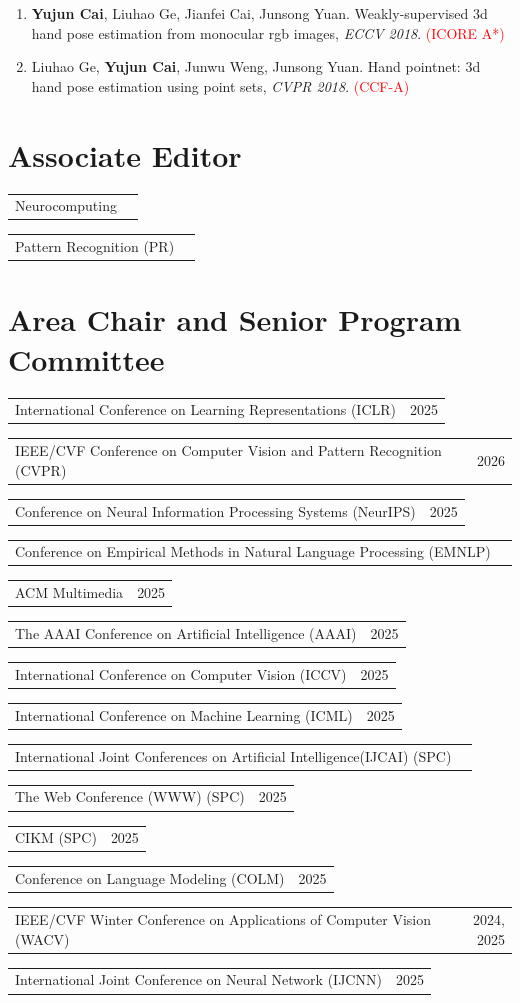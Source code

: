\documentclass[11pt,letterpaper]{article}
\makeatletter
\newcommand{\cvService}[2]{\par\begin{tabularx}{\linewidth}{@{}Xr@{}}#1 & #2\end{tabularx}\par}
\makeatother
\begin{document}
\begin{enumerate}
\item \textbf{Yujun Cai}, Liuhao Ge, Jianfei Cai, Junsong Yuan. Weakly-supervised 3d hand pose estimation from monocular rgb images, \textit{ECCV 2018}. \textcolor{red}{(ICORE A*)}

\item Liuhao Ge, \textbf{Yujun Cai}, Junwu Weng, Junsong Yuan. Hand pointnet: 3d hand pose estimation using point sets, \textit{CVPR 2018}. \textcolor{red}{(CCF-A)}
\end{enumerate}

\section*{Associate Editor}
\cvService{Neurocomputing}{}
\cvService{Pattern Recognition (PR)}{}
\section*{Area Chair and Senior Program Committee}
\cvService{International Conference on Learning Representations (ICLR)}{2025}
\cvService{IEEE/CVF Conference on Computer Vision and Pattern Recognition (CVPR)}{2026}
\cvService{Conference on Neural Information Processing Systems (NeurIPS)}{2025}
\cvService{Conference on Empirical Methods in Natural Language Processing (EMNLP)}{}
\cvService{ACM Multimedia}{2025}
\cvService{The AAAI Conference on Artificial Intelligence (AAAI)}{2025}
\cvService{International Conference on Computer Vision (ICCV)}{2025}
\cvService{International Conference on Machine Learning (ICML)}{2025}
\cvService{International Joint Conferences on Artificial Intelligence(IJCAI)   (SPC)}{}
\cvService{The Web Conference (WWW)  (SPC)}{2025}
\cvService{CIKM (SPC)}{2025}
\cvService{Conference on Language Modeling (COLM)}{2025}
\cvService{IEEE/CVF Winter Conference on Applications of Computer Vision (WACV)}{2024, 2025}
\cvService{International Joint Conference on Neural Network (IJCNN)}{2025}
\end{document}
